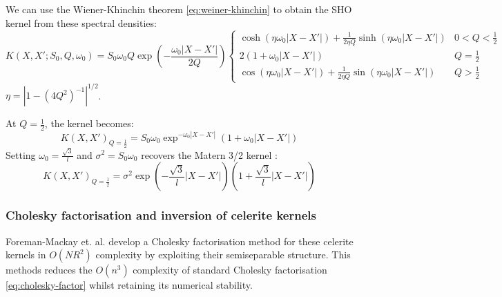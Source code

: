 We can use the Wiener-Khinchin theorem \ref{eq:weiner-khinchin} to obtain the SHO kernel from these spectral densities:
\begin{equation*}
    K(X, X'; S_0, Q, \omega_0) = S_0 \omega_0 Q \exp \left( -\frac{\omega_0 |X - X'|}{2Q} \right) \begin{cases}
            \cosh (\eta \omega_0 |X - X'|) + \frac{1}{2 \eta Q} \sinh ( \eta \omega_0 |X - X'|) & 0 < Q < \frac{1}{2} \\
            2(1 + \omega_0 |X - X'|) & Q = \frac{1}{2} \\
            \cos (\eta \omega_0 |X - X'|) + \frac{1}{2 \eta Q} \sin ( \eta \omega_0 |X - X'|) & Q > \frac{1}{2}
    \end{cases}
\end{equation*}
$\eta = |1 - (4Q^2)^{-1} |^{1/2}$. 

At $Q = \frac{1}{2}$, the kernel becomes:
\begin{equation*}
    K(X, X')_{Q = \frac{1}{2}} = S_0 \omega_0 \exp^{- \omega_0 |X - X'|} \left( 1 + \omega_0 |X - X'| \right)
\end{equation*}
Setting $\omega_0 = \frac{\sqrt{3}}{l}$ and $\sigma^2 = S_0 \omega_0$ recovers the Matern 3/2 kernel \label{eq:matern-32}:
\begin{equation*}
    K(X, X')_{Q = \frac{1}{2}} = \sigma^2 \exp \left(- \frac{\sqrt{3}}{l} |X - X'|\right) \left( 1 + \frac{\sqrt{3}}{l} |X - X'| \right)
\end{equation*}

\subsubsection{Cholesky factorisation and inversion of celerite kernels}
Foreman-Mackay et. al. \cite{foreman-mackay} develop a Cholesky factorisation method for these celerite kernels in $O(NR^2)$ complexity by exploiting their semiseparable structure. This methods reduces the $O(n^3)$ complexity of standard Cholesky factorisation \ref{eq:cholesky-factor} whilst retaining its numerical stability.

